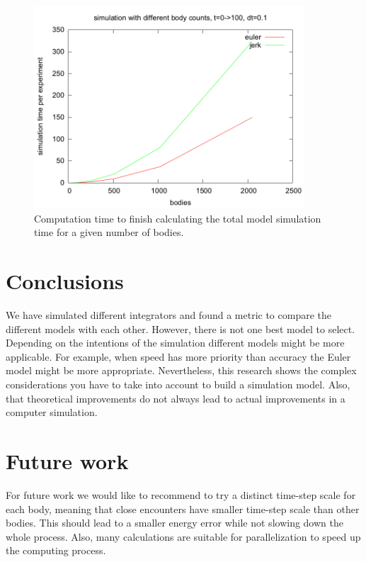 \documentclass[11pt]{article} %
\begin{document}
\begin{figure}
    \includegraphics[width=0.9\textwidth]{time_bodies.png}
    \caption{Computation time to finish calculating the total model simulation time for a given number of bodies.}
    \label{fig:time}
\end{figure}

\section{Conclusions}
\label{sec:conclusion}
We have simulated different integrators and found a metric to compare the different models with each other. However, there is not one best model to select. Depending on the intentions of the simulation different models might be more applicable. For example, when speed has more priority than accuracy the Euler model might be more appropriate. Nevertheless, this research shows the complex considerations you have to take into account to build a simulation model. Also, that theoretical improvements do not always lead to actual improvements in a computer simulation. 

\section{Future work}
For future work we would like to recommend to try a distinct time-step scale for each body, meaning that close encounters have smaller time-step scale than other bodies. This should lead to a smaller energy error while not slowing down the whole process. Also, many calculations are suitable for parallelization to speed up the computing process. 





\end{document}
